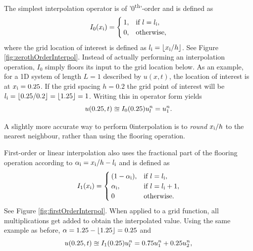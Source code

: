 The simplest interpolation operator is of '0\textsuperscript{th}'-order and is defined as
\begin{equation}\label{eq:zerothOrderI}
    I_0(x_{\text{i}}) = \begin{cases}
        1, & \text{if}\ l = l_{\text{i}},\\
        0, & \text{otherwise},
    \end{cases}
\end{equation}
where the grid location of interest is defined as $l_\itxt = \floor[x_\itxt / h]$. See Figure \ref{fig:zerothOrderInterpol}. Instead of actually performing an interpolation operation, $I_0$ simply floors its input to the grid location below. As an example, for a 1D system of length $L=1$ described by $u(x,t)$, the location of interest is at $x_{\text{i}} = 0.25$. If the grid spacing $h = 0.2$ the grid point of interest will be $l_\itxt = \floor[0.25/0.2] = \floor[1.25] = 1$. Writing this in operator form yields
\begin{equation*}
    u(0.25, t)\approxeq I_0(0.25)u_l^n = u_1^n.
\end{equation*}

% 


A slightly more accurate way to perform 0\thOrder interpolation is to \textit{round} $x_{\text{i}}/h$ to the nearest neighbour, rather than using the flooring operation. 

First-order or linear interpolation also uses the fractional part of the flooring operation according to $\alpha_{\text{i}} = x_{\text{i}} / h - l_{\text{i}}$ and is defined as
\begin{equation}\label{eq:firstOrderI}
    I_1(x_{\text{i}}) = \begin{cases}
        (1-\alpha_{\text{i}}), & \text{if}\ l = l_{\text{i}},\\
        \alpha_{\text{i}} , & \text{if}\ l = l_{\text{i}} + 1,\\
        0 & \text{otherwise.}
    \end{cases}
\end{equation}
See Figure \ref{fig:firstOrderInterpol}. When applied to a grid function, all multiplications get added to obtain the interpolated value. Using the same example as before, $\alpha = 1.25 - \floor[1.25] = 0.25$ and
\begin{equation*}
    u(0.25, t)\approxeq I_1(0.25)u_l^n = 0.75u_1^n + 0.25 u_2^n,
\end{equation*}

